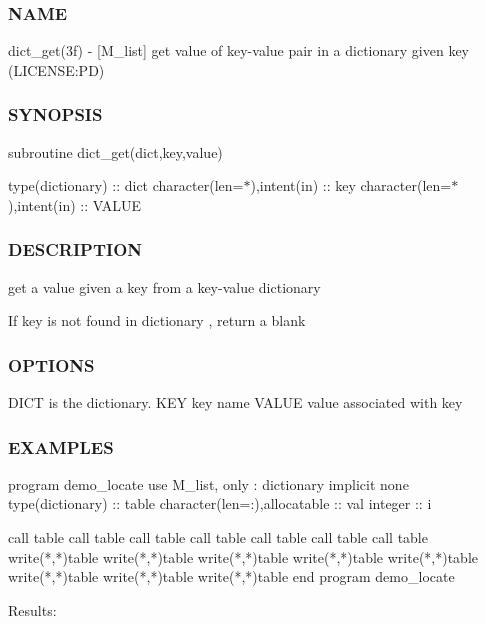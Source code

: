 \subsubsection*{N\+A\+ME}

dict\+\_\+get(3f) -\/ \mbox{[}M\+\_\+list\mbox{]} get value of key-\/value pair in a dictionary given key (L\+I\+C\+E\+N\+SE\+:PD) 

\subsubsection*{S\+Y\+N\+O\+P\+S\+IS}

subroutine dict\+\_\+get(dict,key,value)

type(dictionary) \+:\+: dict character(len=$\ast$),intent(in) \+:\+: key character(len=$\ast$),intent(in) \+:\+: V\+A\+L\+UE

\subsubsection*{D\+E\+S\+C\+R\+I\+P\+T\+I\+ON}

\begin{DoxyVerb}get a value given a key from a key-value dictionary

If key is not found in dictionary , return a blank
\end{DoxyVerb}


\subsubsection*{O\+P\+T\+I\+O\+NS}

\begin{DoxyVerb}DICT     is the dictionary.
KEY      key name
VALUE    value associated with key
\end{DoxyVerb}


\subsubsection*{E\+X\+A\+M\+P\+L\+ES}

\begin{DoxyVerb} program demo_locate
 use M_list, only : dictionary
 implicit none
 type(dictionary)             :: table
 character(len=:),allocatable :: val
 integer          :: i

 call table%
 call table%
 call table%
 call table%
 call table%
 call table%
 call table%
 write(*,*)table%
 write(*,*)table%
 write(*,*)table%
 write(*,*)table%
 write(*,*)table%
 write(*,*)table%
 write(*,*)table%
 write(*,*)table%
 end program demo_locate

Results:
\end{DoxyVerb}


